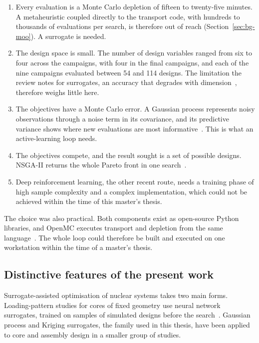 \begin{enumerate}
  \item Every evaluation is a Monte Carlo depletion of fifteen to
        twenty-five minutes. A metaheuristic coupled directly to the
        transport code, with hundreds to thousands of evaluations per
        search, is therefore out of reach
        (Section~\ref{sec:bg-moo}). A surrogate is needed.

  \item The design space is small. The number of design variables ranged
        from six to four across the campaigns, with four in the final
        campaigns, and each of the nine campaigns evaluated between 54 and
        114 designs. The limitation the review notes for surrogates, an
        accuracy that degrades with dimension~\cite{jin_2011}, therefore
        weighs little here.

  \item The objectives have a Monte Carlo error. A Gaussian process
        represents noisy observations through a noise term in its
        covariance, and its predictive variance shows where new
        evaluations are most informative~\cite{rasmussen_gp_2006}. This
        is what an active-learning loop needs.

  \item The objectives compete, and the result sought is a set of
        possible designs. NSGA-II returns the whole Pareto front in one
        search~\cite{deb_nsga2_2002}.

  \item Deep reinforcement learning, the other recent route, needs a
        training phase of high sample complexity and a complex
        implementation, which could not be achieved within the time of
        this master's thesis.
\end{enumerate}

The choice was also practical. Both components exist as open-source
Python libraries, and OpenMC executes transport and depletion from the same
language~\cite{romano_openmc_2015,romano_2021_depletion}. The whole loop
could therefore be built and executed on one workstation within the time of
a master's thesis.

\subsection{Distinctive features of the present work}
\label{sec:lit-opt-distinct}

Surrogate-assisted optimisation of nuclear systems takes two main forms.
Loading-pattern studies for cores of fixed geometry use neural network
surrogates, trained on samples of simulated designs before the
search~\cite{whyte_2020,wan_2022}. Gaussian process and Kriging
surrogates, the family used in this thesis, have been applied to core
and assembly design in a smaller group of studies.

